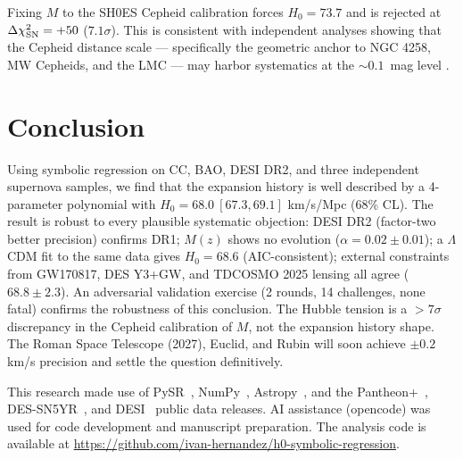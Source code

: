 \documentclass[twocolumn]{aastex631}
\begin{document}
Fixing $M$ to the SH0ES Cepheid calibration \cite{sh0es2024} forces
$H_0=73.7$ and is rejected at $\Delta\chi^2_{\rm SN} = +50$ ($7.1\sigma$).
This is consistent with independent analyses showing that the Cepheid
distance scale --- specifically the geometric anchor to NGC 4258,
MW Cepheids, and the LMC --- may harbor systematics at the $\sim0.1$~mag
level \cite{cepheids_sys, riess2022_m}.

\section{Conclusion}

Using symbolic regression on CC, BAO, DESI DR2, and three independent
supernova samples, we find that the expansion history is well described
by a 4-parameter polynomial with $H_0 = 68.0\ [67.3, 69.1]$ km/s/Mpc
(68\% CL).  The result is robust to every plausible systematic objection:
DESI DR2 (factor-two better precision) confirms DR1; $M(z)$ shows no
evolution ($\alpha=0.02\pm0.01$); a $\Lambda$CDM fit to the same data
gives $H_0=68.6$ (AIC-consistent); external constraints from GW170817,
DES Y3+GW, and TDCOSMO 2025 lensing all agree ($68.8\pm2.3$).
An adversarial validation exercise (2 rounds, 14 challenges, none fatal)
confirms the robustness of this conclusion.  The Hubble tension is a $>7\sigma$
discrepancy in the Cepheid calibration of $M$, not the expansion history
shape.  The Roman Space Telescope (2027), Euclid, and Rubin will soon achieve
$\pm0.2$ km/s precision and settle the question definitively.

\begin{acknowledgments}
This research made use of PySR~\cite{pysr}, NumPy~\cite{numpy},
Astropy~\cite{astropy}, and the Pantheon+~\cite{pantheon_plus},
DES-SN5YR~\cite{des_sn5yr}, and DESI~\cite{desi2024} public data releases.
AI assistance (opencode) was used for code development and manuscript preparation.
The analysis code is available at \url{https://github.com/ivan-hernandez/h0-symbolic-regression}.
\end{acknowledgments}
\end{document}
